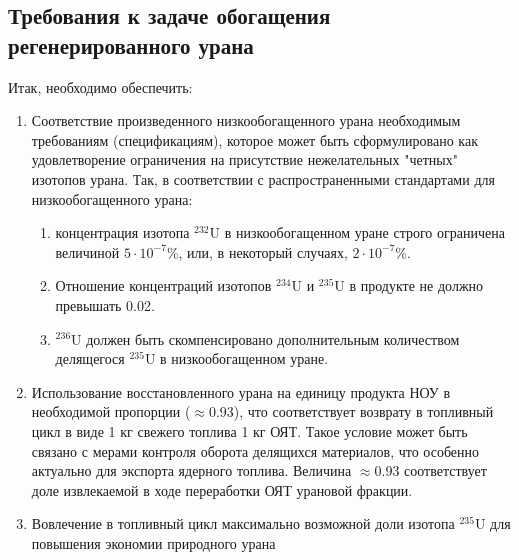 \subsection{Требования к задаче обогащения регенерированного урана}

Итак, необходимо обеспечить:
\begin{enumerate}
  \item Соответствие произведенного низкообогащенного урана необходимым требованиям (спецификациям), которое может быть сформулировано как удовлетворение ограничения на присутствие нежелательных "четных" изотопов урана. Так, в соответствии с распространенными стандартами для низкообогащенного урана:
  \begin{enumerate}
    \item концентрация изотопа $^{232}$U в низкообогащенном уране строго ограничена величиной $5\cdot10^{-7}$\%, или, в некоторый случаях, $2\cdot10^{-7}$\%.
    \item Отношение концентраций изотопов $^{234}$U и $^{235}$U в продукте не должно превышать 0.02.
    \item $^{236}$U должен быть скомпенсировано дополнительным количеством делящегося $^{235}$U в низкообогащенном уране.
  \end{enumerate}
  \item Использование восстановленного урана на единицу продукта НОУ в необходимой пропорции ($\approx$0.93), что соответствует возврату в топливный цикл в виде 1 кг свежего топлива 1 кг ОЯТ. Такое условие может быть связано с мерами контроля оборота делящихся материалов, что особенно актуально для экспорта ядерного топлива. Величина  $\approx$0.93 соответствует доле извлекаемой в ходе переработки ОЯТ урановой фракции.
  \item Вовлечение в топливный цикл максимально возможной доли изотопа $^{235}$U для повышения экономии природного урана
\end{enumerate}

